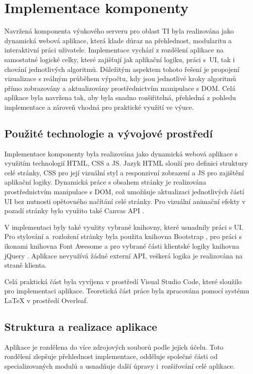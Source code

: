 \chapter{Implementace komponenty}
Navržená komponenta výukového serveru pro oblast TI byla realizována jako dynamická webová aplikace, která klade důraz na přehlednost, modularitu a interaktivní práci uživatele. Implementace vychází z rozdělení aplikace na samostatné logické celky, které zajišťují jak aplikační logiku, práci s~UI, tak i chování jednotlivých algoritmů. Důležitým aspektem tohoto řešení je propojení vizualizace s reálným průběhem výpočtu, kdy jsou jednotlivé kroky algoritmů přímo zobrazovány a aktualizovány prostřednictvím manipulace s DOM. Celá aplikace byla navržena tak, aby byla snadno rozšiřitelná, přehledná z pohledu implementace a zároveň vhodná pro praktické využití ve výuce.


\section{Použité technologie a vývojové prostředí}
Implementace komponenty byla realizována jako dynamická webová aplikace s využitím technologií HTML, CSS a JS. Jazyk HTML slouží pro definici struktury celé stránky, CSS pro její vizuální styl a responzivní zobrazení a JS pro zajištění aplikační logiky. Dynamická práce s obsahem stránky je realizována prostřednictvím manipulace s DOM, což umožňuje aktualizaci jednotlivých částí UI bez nutnosti opětovného načítání celé stránky. Pro vizuální animační efekty v pozadí stránky bylo využito také Canvas API \cite{canvas_api}.

V implementaci byly také využity vybrané knihovny, které usnadnily práci s UI. Pro stylování a~rozložení stránky byla použita knihovna Bootstrap \cite{bootstrap}, pro práci s ikonami knihovna Font Awesome \cite{font_awesome} a pro vybrané části klientské logiky knihovna jQuery \cite{jquery}. Aplikace nevyužívá žádné externí API, veškerá logika je realizována na straně klienta.

Celá praktická část byla vyvíjena v prostředí Visual Studio Code, které sloužilo pro implementaci aplikace. Teoretická část práce byla zpracována pomocí systému \LaTeX{} v prostředí Overleaf.


\section{Struktura a realizace aplikace}
Aplikace je rozdělena do více zdrojových souborů podle jejich účelu. Toto rozdělení zlepšuje přehlednost implementace, odděluje společné části od specializovaných modulů a usnadňuje další úpravy i~rozšiřování celé aplikace.

